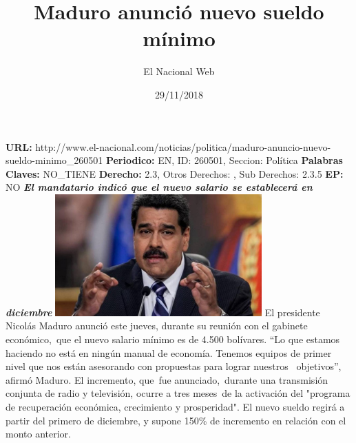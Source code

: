 \documentclass{article}%
\title{\textbf{Maduro anunció nuevo sueldo mínimo}}%
\author{El Nacional Web}%
\date{29/11/2018}%
\begin{document}
%
\normalsize%
\maketitle%
\textbf{URL: }%
http://www.el{-}nacional.com/noticias/politica/maduro{-}anuncio{-}nuevo{-}sueldo{-}minimo\_260501\newline%
%
\textbf{Periodico: }%
EN, %
ID: %
260501, %
Seccion: %
Política\newline%
%
\textbf{Palabras Claves: }%
NO\_TIENE\newline%
%
\textbf{Derecho: }%
2.3, %
Otros Derechos: %
, %
Sub Derechos: %
2.3.5\newline%
%
\textbf{EP: }%
NO\newline%
\newline%
%
\textbf{\textit{El mandatario indicó que el nuevo salario se establecerá en diciembre}}%
\newline%
\newline%
%
\includegraphics[width=300px]{261.jpg}%
\newline%
%
El presidente Nicolás Maduro anunció este jueves, durante su reunión con el gabinete económico,~que el nuevo salario mínimo es de 4.500 bolívares.%
\newline%
%
“Lo que estamos haciendo no está en ningún manual de economía. Tenemos equipos de primer nivel que nos están asesorando con propuestas para lograr nuestros ~objetivos”, afirmó Maduro.%
\newline%
%
El incremento, que~fue anunciado,~durante una transmisión conjunta de radio y televisión, ocurre a tres meses~de la activación del "programa de recuperación económica, crecimiento y prosperidad".%
\newline%
%
El nuevo sueldo regirá a partir del primero de diciembre, y supone 150\% de incremento en relación con el monto anterior.%
\newline%
%
\end{document}
